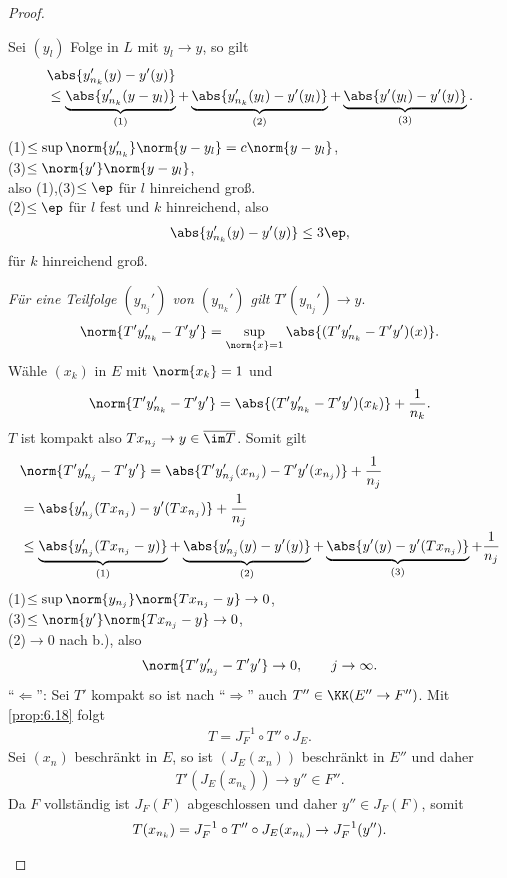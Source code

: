 \begin{proof}
\begin{proofenum}
Sei $(y_l)$ Folge in $L$ mit $y_l\to y$, so gilt
\begin{align*}
&\abs{y_{n_k}'(y)-y'(y)}\\ &
 \le \underbrace{\abs{y_{n_k}'(y-y_l)}}_{\text{(1)}} +
\underbrace{\abs{y_{n_k}'(y_l)-y'(y_l)}}_{\text{(2)}} + 
\underbrace{\abs{y'(y_l)-y'(y)}}_{\text{(3)}}.
\end{align*}
(1)$\le \sup\norm{y_{n_k}'}\norm{y-y_l} = c \norm{y-y_l}$,\\
(3)$\le \norm{y'}\norm{y-y_l}$,\\
also (1),(3)$\le \ep$ für $l$ hinreichend groß.\\
(2)$\le \ep$ für $l$ fest und $k$ hinreichend, also
\begin{align*}
\abs{y_{n_k}'(y)-y'(y)} \le 3 \ep,
\end{align*}
für $k$ hinreichend groß.
\item \textit{Für eine Teilfolge $(y_{n_j}')$ von $(y_{n_k}')$ gilt
$T'(y_{n_j}')\to y$}.
\begin{align*}
\norm{T'y_{n_k}' - T'y'} = \sup\limits_{\norm{x}=1}
\abs{(T'y_{n_k}'-T'y')(x)}.
\end{align*}
Wähle $(x_k)$ in $E$ mit $\norm{x_k} = 1$ und
\begin{align*}
\norm{T'y_{n_k}' - T'y'} = \abs{(T'y_{n_k}'-T'y')(x_k)} + \frac{1}{n_k}.
\end{align*}
$T$ ist kompakt also $Tx_{n_j}\to y \in \overline{\im T}$. Somit gilt
\begin{align*}
&\norm{T'y_{n_j}' - T'y'} =
\abs{T'y_{n_j}'(x_{n_j}) - T'y'(x_{n_j})} + \frac{1}{n_j}\\
&= \abs{y_{n_j}'(Tx_{n_j})-y'(Tx_{n_j})} + \frac{1}{n_j}\\
&\le \underbrace{\abs{y_{n_j}'(Tx_{n_j}-y)}}_{\text{(1)}} +
\underbrace{\abs{y_{n_j}'(y)-y'(y)}}_{\text{(2)}} +
\underbrace{\abs{y'(y)-y'(Tx_{n_j})}}_{\text{(3)}} + \frac{1}{n_j}
\end{align*}
(1)$\le \sup\norm{y_{n_j}}\norm{Tx_{n_j}-y} \to 0$,\\
(3)$\le \norm{y'}\norm{Tx_{n_j}-y}\to 0$,\\
(2)$ \to 0$ nach b.), also
\begin{align*}
\norm{T'y_{n_j}' - T'y'} \to 0,\qquad j\to\infty.
\end{align*}
``$\Leftarrow$'': Sei $T'$ kompakt so ist nach ``$\Rightarrow$'' auch $T''\in
\KK(E''\to F'')$. Mit \ref{prop:6.18} folgt
\begin{align*}
T = J_F^{-1}\circ T''\circ J_E.
\end{align*}
Sei $(x_n)$ beschränkt in $E$, so ist $(J_E(x_n))$ beschränkt in $E''$ und
daher
\begin{align*}
T'(J_E(x_{n_k}))\to y''\in F''. 
\end{align*}
Da $F$ vollständig ist $J_F(F)$
abgeschlossen und daher $y''\in J_F(F)$, somit
\begin{align*}
T(x_{n_k}) = J_F^{-1}\circ T''\circ J_E(x_{n_k}) \to J_F^{-1}(y'').\qedhere
\end{align*}
\end{proofenum}
\end{proof}

